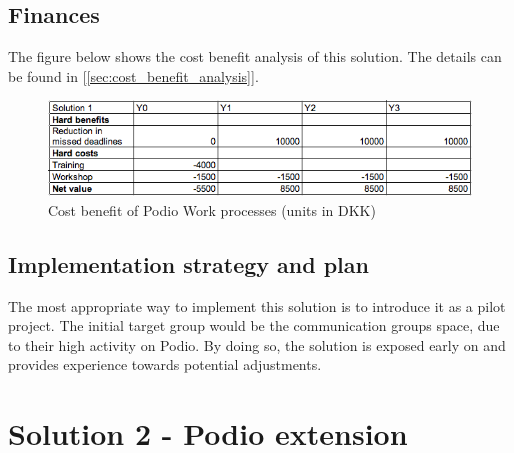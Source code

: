\subsection{Finances}
The figure below shows the cost benefit analysis of this solution. The details can be found in [\ref{sec:cost_benefit_analysis}].
\begin{figure}[h!]
  \centering
\includegraphics[scale=0.5]{Pictures/cost-benefit1.png}
    \caption{Cost benefit of Podio Work processes (units in DKK)}
\end{figure}


\subsection{Implementation strategy and plan} 
The most appropriate way to implement this solution is to introduce it as a pilot project. The initial target group would be the communication groups space, due to their high activity on Podio. By doing so, the solution is exposed early on and provides experience towards potential adjustments.


\section{Solution 2 - Podio extension}
